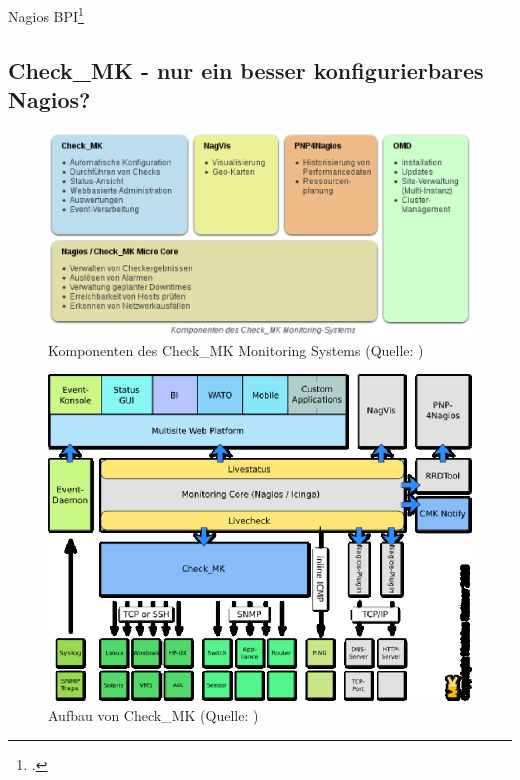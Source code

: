 \documentclass[12pt,a4paper,parskip,listof=totoc,bibliography=totoc]{scrreprt}
\begin{document}
	
	Nagios BPI\footcite{nagiosbpi}
	
	\subsection{Check\_MK - nur ein besser konfigurierbares Nagios?}
	\begin{figure}[!h]
		\centering
		\includegraphics[width=1\textwidth]{pics/checkMKAufbau.eps}
		\caption[Komponenten des Check\_MK Monitoring Systems]{Komponenten des Check\_MK Monitoring Systems (Quelle: \cite{checkmkmonitoringpic})}
		\label{fig:checkmk}
	\end{figure}
	\begin{figure}[!h]
		\centering
		\includegraphics[width=1\textwidth]{pics/OMD_Schema.eps}
		\caption[Aufbau von Check\_MK]{Aufbau von Check\_MK (Quelle: \cite{checkmk})}
		\label{fig:checkmkaufbau}
	\end{figure}
	\clearpage
	
\end{document}
